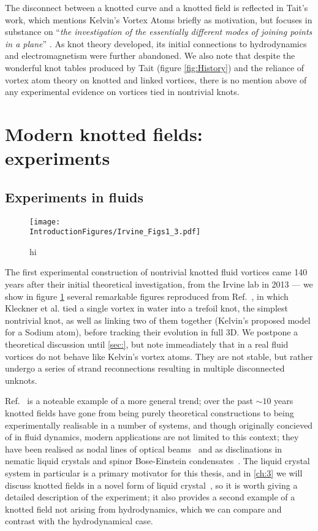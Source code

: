 The disconnect between a knotted curve and a knotted field is reflected in Tait's work, which mentions Kelvin's Vortex Atoms briefly as motivation, but focuses in substance on ``\emph{the investigation of the essentially different modes of joining points in a plane}'' \citep{Tait1}. As knot theory developed, its initial connections to hydrodynamics and electromagnetism were further abandoned. We also note that despite the wonderful knot tables produced by Tait (figure \ref{fig:History}) and the reliance of vortex atom theory on knotted and linked vortices, there is no mention above of any experimental evidence on vortices tied in nontrivial knots. 

\section{Modern knotted fields: experiments}
\subsection{Experiments in fluids}
\begin{figure}[htbp]
\centering
\texttt{[image: \\IntroductionFigures/Irvine\_Figs1\_3.pdf]}
\caption{hi }
\label{fig:Irvine}
\end{figure}
The first experimental construction of nontrivial knotted fluid vortices came 140 years after their initial theoretical investigation, from the Irvine lab in 2013 --- we show in figure \ref{fig:Irvine} several remarkable figures reproduced from Ref.~\citep{Kleckner2013}, in which Kleckner et al. tied a single vortex in water into a trefoil knot, the simplest nontrivial knot, as well as linking two of them together (Kelvin's proposed model for a Sodium atom), before tracking their evolution in full 3D. We postpone a theoretical discussion until \ref{sec:}, but note immeadiately that in a real fluid vortices do not behave like Kelvin's vortex atoms. They are not stable, but rather undergo a series of strand reconnections resulting in multiple disconnected unknots.

Ref.~\citep{Kleckner2013} is a noteable example of a more general trend; over the past $\sim10$ years knotted fields have gone from being purely theoretical constructions to being experimentally realisable in a number of systems, and though originally concieved of in fluid dynamics, modern applications are not limited to this context; they have been realised as nodal lines of optical beams~\cite{Dennis2010} and as disclinations in nematic liquid crystals and spinor Bose-Einstein condensates~\cite{Tkalec2011,Tasinkevych2014,Copar2015}. The liquid crystal system in particular is a primary motivator for this thesis, and in \ref{ch:3} we will discuss knotted fields in a novel form of liquid crystal~\cite{LavrentovichReview}, so it is worth giving a detailed description of the experiment; it also provides a second example of a knotted field not arising from hydrodynamics, which we can compare and contrast with the hydrodynamical case.

